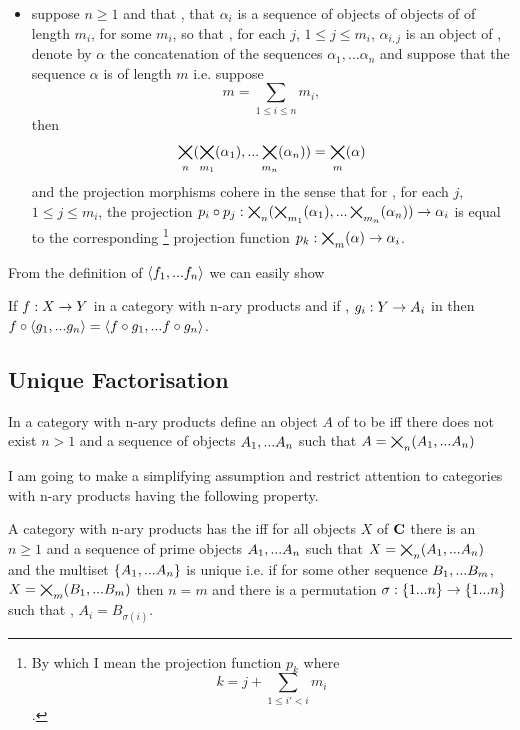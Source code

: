 \documentclass[10pt,a4paper]{scrartcl}
\begin{document}
\begin{definition}
\begin{itemize}
\item suppose $n \geq 1$ and that \foreachi, that $\alpha_i$ is a sequence of objects of objects of \catcw of length $m_i$, for some $m_i$,
so that \foreachi, for each $j$, $1 \leq j \leq m_i$, $\alpha_{i,j}$ is an object of \catc,  denote by $\alpha$ the concatenation of the sequences
$\alpha_1,...\alpha_n$ and suppose that the sequence $\alpha$ is of length $m$ i.e. suppose  
$$m=\sum_{1 \leq i \leq n}m_i,$$ 
then
$$
\bigtimes_{n} (\bigtimes_{m_1}(\alpha_1),...\bigtimes_{m_n}(\alpha_n))= \bigtimes_{m}(\alpha)
$$
and the projection morphisms cohere in the sense that for \foreachi, for each $j$, $1 \leq j \leq m_i$, 
the projection $p_i \circ p_j:\bigtimes_{n} (\bigtimes_{m_1}(\alpha_1),...\bigtimes_{m_n}(\alpha_n)) \rightarrow \alpha_i$
is equal to the corresponding \footnote{
By which I mean the projection function $p_k$ where  $$k = j + \sum_{1 \leq i' < i}m_i$$.}
projection function $p_{k} : \bigtimes_{m}(\alpha) \rightarrow \alpha_i$.  
\end{itemize}
\end{definition}

From the definition of $\langle f_1,...f_n\rangle$ we can easily show
\begin{lemma}
If $f: X \rightarrow Y$ in a category with n-ary products \catcw and if \foreachi, $g_i:Y \rightarrow A_i$
in \catcw then $f \circ \langle g_1,...g_n\rangle=\langle f \circ g_1,...f \circ g_n\rangle$.
\end{lemma}

\subsection{Unique Factorisation}
\begin{definition}
In a category with n-ary products \catcw define an object $A$ of \catcw to be  iff there does not exist $n > 1$ and a sequence of objects $A_1,...A_n$ 
such that $A=\bigtimes_{n}(A_1,...A_n)$
\end{definition}
I am going to make a simplifying assumption and restrict attention to categories with n-ary products having the following property.
\begin{definition}
A category with n-ary products has the  iff for all objects $X$ of $\textbf{C}$
there is an $n \geq 1$ and a sequence of prime objects $A_1,...A_n$ such that $X=\bigtimes_{n}(A_1,...A_n)$ and the multiset $\left\{A_1,...A_n\right\}$
is unique i.e. if for some other sequence $B_1,...B_m$, $X=\bigtimes_{m}(B_1,...B_m)$ then $n=m$ and there is a permutation $\sigma:\left\{1...n\right\} \rightarrow \left\{1...n\right\}$ such that \foreachi,
$A_i=B_{\sigma(i)}$.
\end{definition}
\end{document}
